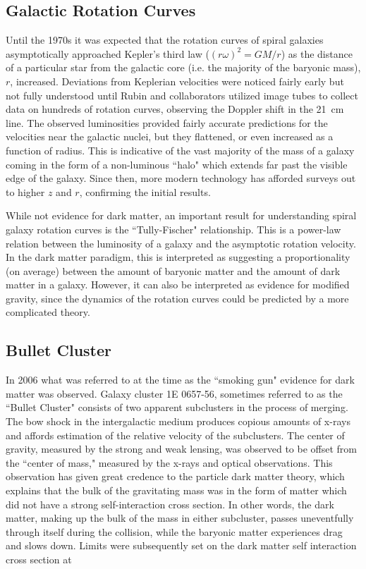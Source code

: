 \subsection{Galactic Rotation Curves}
Until the 1970s it was expected that the rotation curves of spiral galaxies asymptotically approached Kepler's third law ($(r\omega)^2 = GM/r$) as the distance of a particular star from the galactic core (i.e. the majority of the baryonic mass), $r$, increased. 
Deviations from Keplerian velocities were noticed fairly early but not fully understood until Rubin and collaborators utilized image tubes to collect data on hundreds of rotation curves, observing the Doppler shift in the 21~cm line.
The observed luminosities provided fairly accurate predictions for the velocities near the galactic nuclei, but they flattened, or even increased as a function of radius.
This is indicative of the vast majority of the mass of a galaxy coming in the form of a non-luminous ``halo" which extends far past the visible edge of the galaxy.
Since then, more modern technology has afforded surveys out to higher $z$ and $r$, confirming the initial results.

While not evidence for dark matter, an important result for understanding spiral galaxy rotation curves is the ``Tully-Fischer" relationship.
This is a power-law relation between the luminosity of a galaxy and the asymptotic rotation velocity. 
In the dark matter paradigm, this is interpreted as suggesting a proportionality (on average) between the amount of baryonic matter and the amount of dark matter in a galaxy.
However, it can also be interpreted as evidence for modified gravity, since the dynamics of the rotation curves could be predicted by a more complicated theory.


\subsection{Bullet Cluster}
\label{sec:bullet}
In 2006 what was referred to at the time as the ``smoking gun" evidence for dark matter was observed\cite{clowe_direct_2006}.
Galaxy cluster 1E 0657-56, sometimes referred to as the ``Bullet Cluster" consists of two apparent subclusters in the process of merging.
The bow shock in the intergalactic medium produces copious amounts of x-rays and affords estimation of the relative velocity of the subclusters.
The center of gravity, measured by the strong and weak lensing, was observed to be offset from the ``center of mass," measured by the x-rays and optical observations. 
This observation has given great credence to the particle dark matter theory,
which explains that the bulk of the gravitating mass was in the form of matter which did not have a strong self-interaction cross section.
In other words, the dark matter, making up the bulk of the mass in either subcluster, passes uneventfully through itself during the collision, while the baryonic matter experiences drag and slows down.
Limits were subsequently set on the dark matter self interaction cross  section\cite{randall_constraints_2008} at

